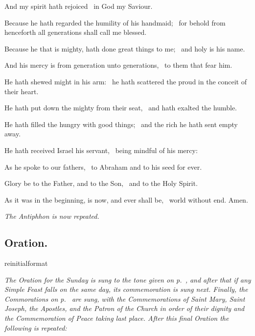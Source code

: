 \documentclass[12pt]{article} %
\newcommand{\myaboveinitial}[1]{%
    \expandafter\renewcommand\csname greinitialformat\endcsname[1]{%
        \fontsize{43}{43}\selectfont ##1
    }
    \gresetfirstlineaboveinitial{\textcolor{benred8}{\raisebox{6.0mm}{\small \textsc{\textbf{#1}}}}}{}
}
\newenvironment{psalmtext}{\leftskip 0.25in}{\vspace{1 mm}}
\newenvironment{rubric}{\vspace{1 mm}\color{benred8} \itshape \leftskip 0in \setlength{\parindent}{0.25in}}{\vspace{1 mm}}
\let\oldgresixstar\gresixstar
\renewcommand{\gresixstar}{\textcolor{benred8}{\oldgresixstar}}
\let\oldVbar\Vbar
\renewcommand{\Vbar}{\textcolor{benred8}{\oldVbar .}}
\begin{document}
\begin{pages}
\begin{Rightside}
\begin{psalmtext}
\hspace*{9.5 mm}And my spirit hath rejoiced \gresixstar\ in God my Saviour.

Because he hath regarded the humility of his handmaid; \gresixstar\ for behold from henceforth all generations shall call me blessed.

Because he that is mighty, hath done great things to me; \gresixstar\ and holy is his name.

And his mercy is from generation unto generations, \gresixstar\ to them that fear him.

He hath shewed might in his arm: \gresixstar\ he hath scattered the proud in the conceit of their heart.

He hath put down the mighty from their seat, \gresixstar\ and hath exalted the humble.

He hath filled the hungry with good things; \gresixstar\ and the rich he hath sent empty away.

He hath received Israel his servant, \gresixstar\ being mindful of his mercy:

As he spoke to our fathers, \gresixstar\ to Abraham and to his seed for ever.

Glory be to the Father, and to the Son, \gresixstar\ and to the Holy Spirit.

As it was in the beginning, is now, and ever shall be, \gresixstar\ world without end. Amen.

\end{psalmtext}

\pend\pstart

\begin{rubric}
The Antiphhon is now repeated.

\end{rubric}

\pend\pstart

\subsection*{Oration.}

\pend\pstart


\myaboveinitial{\Vbar}

\pend\pstart

\begin{rubric}
The Oration for the Sunday is sung to the tone given on p.~\pageref{sec:TonusOrationis}, and after that if any Simple Feast falls on the same day, its commemoration is sung next. Finally, the Commorations on p.~\pageref{sec:Commem} are sung, with the Commemorations of Saint Mary, Saint Joseph, the Apostles, and the Patron of the Church in order of their dignity and the Commemoration of Peace taking last place. After this final Oration the following is repeated:


\end{rubric}
\end{Rightside}
\end{pages}
\end{document}
